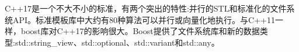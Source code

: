 

C++17是一个不大不小的标准，有两个突出的特性:并行的STL和标准化的文件系统API。标准模板库中大约有80种算法可以并行或向量化地执行。与C++11一样，boost库对C++17的影响很大。Boost提供了文件系统库和新的数据类型:std::string\_view、std::optional、std::variant和std::any。
